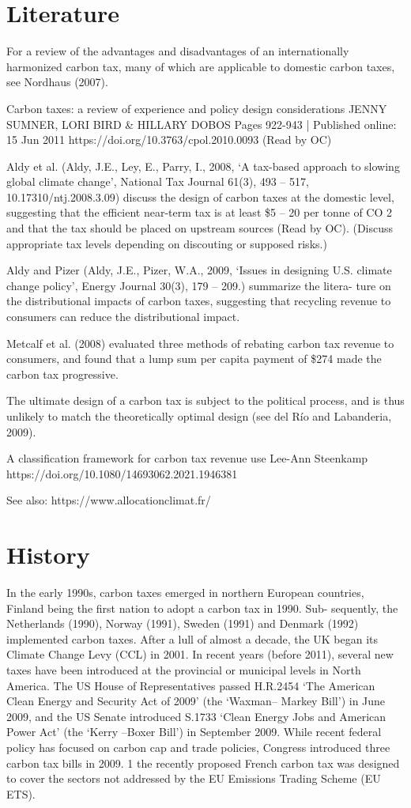 \documentclass[version=3.21, pagesize, twoside=off, bibliography=totoc, DIV=calc, fontsize=12pt, a4paper, french, english]{scrartcl}
\begin{document}
\section{Literature}
For a review of
the advantages and disadvantages of an internationally harmonized carbon tax, many of which are
applicable to domestic carbon taxes, see Nordhaus (2007).

Carbon taxes: a review of experience and policy design considerations JENNY SUMNER, LORI BIRD \& HILLARY DOBOS Pages 922-943 | Published online: 15 Jun 2011 https://doi.org/10.3763/cpol.2010.0093 (Read by OC)

Aldy et al. (Aldy, J.E., Ley, E., Parry, I., 2008, ‘A tax-based approach to slowing global climate change’, National Tax Journal 61(3),
493 – 517, 10.17310/ntj.2008.3.09) discuss the design of carbon taxes
at the domestic level, suggesting that the efficient near-term tax is at least \$5 – 20 per tonne of CO 2 and
that the tax should be placed on upstream sources (Read by OC). (Discuss appropriate tax levels depending on discouting or supposed risks.)
 
Aldy and Pizer (Aldy, J.E., Pizer, W.A., 2009, ‘Issues in designing U.S. climate change policy’, Energy Journal 30(3), 179 – 209.) summarize the litera-
ture on the distributional impacts of carbon taxes, suggesting that recycling revenue to consumers can
reduce the distributional impact.

Metcalf et al. (2008) evaluated three methods of rebating
carbon tax revenue to consumers, and found that a lump sum per capita payment of \$274 made the
carbon tax progressive.

The ultimate design of a carbon tax is subject to the political process, and is thus unlikely to match the theoretically optimal design (see del Río and Labanderia, 2009).

A classification framework for carbon tax revenue use
Lee-Ann Steenkamp
https://doi.org/10.1080/14693062.2021.1946381 

See also: https://www.allocationclimat.fr/

\section{History}
In the early 1990s, carbon taxes emerged
in northern European countries, Finland being the first nation to adopt a carbon tax in 1990. Sub-
sequently, the Netherlands (1990), Norway (1991), Sweden (1991) and Denmark (1992) implemented
carbon taxes. After a lull of almost a decade, the UK began its Climate Change Levy (CCL) in 2001. In
recent years (before 2011), several new taxes have been introduced at the provincial or municipal levels in North
America.
The US House of Representatives
passed H.R.2454 ‘The American Clean Energy and Security Act of 2009’ (the ‘Waxman– Markey Bill’) in
June 2009, and the US Senate introduced S.1733 ‘Clean Energy Jobs and American Power Act’ (the
‘Kerry –Boxer Bill’) in September 2009. While recent federal policy has focused on carbon cap and
trade policies, Congress introduced three carbon tax bills in 2009. 1
the recently proposed French carbon tax was
designed to cover the sectors not addressed by the EU Emissions Trading Scheme (EU ETS).
\end{document}

